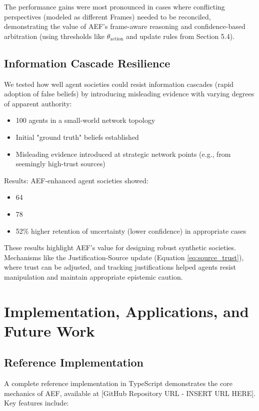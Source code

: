 \documentclass[10pt,a4paper]{article}
\begin{document}
The performance gains were most pronounced in cases where conflicting perspectives (modeled as different Frames) needed to be reconciled, demonstrating the value of AEF's frame-aware reasoning and confidence-based arbitration (using thresholds like $\theta_{\mathrm{action}}$ and update rules from Section 5.4).

\subsection{Information Cascade Resilience}
We tested how well agent societies could resist information cascades (rapid adoption of false beliefs) by introducing misleading evidence with varying degrees of apparent authority:
\begin{itemize}
\item 100 agents in a small-world network topology
\item Initial "ground truth" beliefs established
\item Misleading evidence introduced at strategic network points (e.g., from seemingly high-trust sources)
\end{itemize}

Results: AEF-enhanced agent societies showed:
\begin{itemize}
\item 64%
\item 78%
\item 52\% higher retention of uncertainty (lower confidence) in appropriate cases
\end{itemize}

These results highlight AEF's value for designing robust synthetic societies. Mechanisms like the Justification-Source update (Equation \ref{eq:source_trust}), where trust can be adjusted, and tracking justifications helped agents resist manipulation and maintain appropriate epistemic caution.

\section{Implementation, Applications, and Future Work}
\subsection{Reference Implementation}
A complete reference implementation in TypeScript demonstrates the core mechanics of AEF, available at [GitHub Repository URL - INSERT URL HERE]. Key features include:
\end{document}
